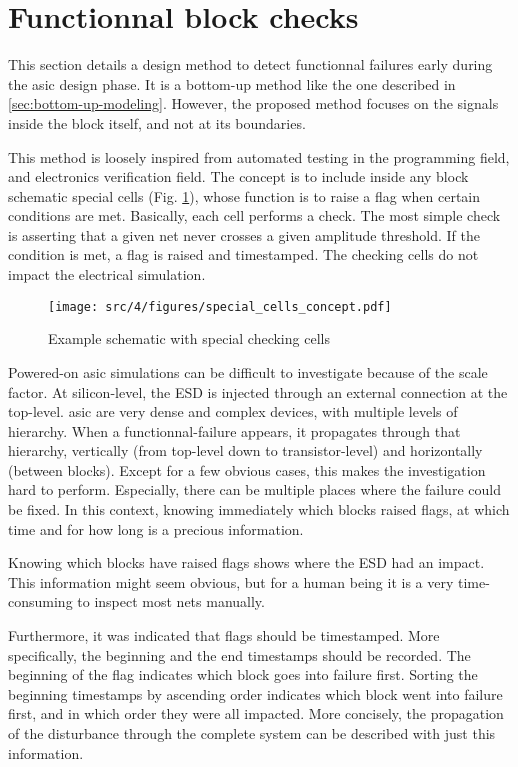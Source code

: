 \section{Functionnal block checks}

This section details a design method to detect functionnal failures early during the \gls{asic} design phase.
It is a bottom-up method like the one described in \ref{sec:bottom-up-modeling}.
However, the proposed method focuses on the signals inside the block itself, and not at its boundaries.

This method is loosely inspired from automated testing in the programming field, and electronics verification field.
The concept is to include inside any block schematic special cells (Fig. \ref{fig:ex-special-cells}), whose function is to raise a flag when certain conditions are met.
Basically, each cell performs a check.
The most simple check is asserting that a given net never crosses a given amplitude threshold.
If the condition is met, a flag is raised and timestamped.
The checking cells do not impact the electrical simulation.

\begin{figure}[!h]
  \centering
  \texttt{[image: src/4/figures/special\_cells\_concept.pdf]}
  \caption{Example schematic with special checking cells}
  \label{fig:ex-special-cells}
\end{figure}

Powered-on \gls{asic} simulations can be difficult to investigate because of the scale factor.
At silicon-level, the ESD is injected through an external connection at the top-level.
\gls{asic} are very dense and complex devices, with multiple levels of hierarchy.
When a functionnal-failure appears, it propagates through that hierarchy, vertically (from top-level down to transistor-level) and horizontally (between blocks).
Except for a few obvious cases, this makes the investigation hard to perform.
Especially, there can be multiple places where the failure could be fixed.
In this context, knowing immediately which blocks raised flags, at which time and for how long is a precious information.

Knowing which blocks have raised flags shows where the ESD had an impact.
This information might seem obvious, but for a human being it is a very time-consuming to inspect most nets manually.

Furthermore, it was indicated that flags should be timestamped.
More specifically, the beginning and the end timestamps should be recorded.
The beginning of the flag indicates which block goes into failure first.
Sorting the beginning timestamps by ascending order indicates which block went into failure first, and in which order they were all impacted.
More concisely, the propagation of the disturbance through the complete system can be described with just this information.

